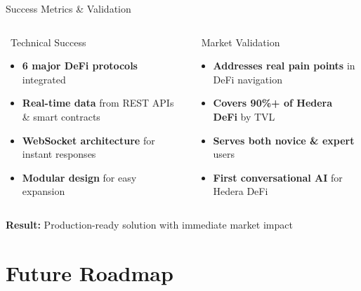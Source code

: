 \documentclass[aspectratio=169]{beamer}
\begin{document}
\begin{frame}{Success Metrics \& Validation}
\begin{columns}
\begin{block}{\faCheckCircle\ Technical Success}
\begin{itemize}
\item \textbf{6 major DeFi protocols} integrated
\item \textbf{Real-time data} from REST APIs \& smart contracts
\item \textbf{WebSocket architecture} for instant responses
\item \textbf{Modular design} for easy expansion
\end{itemize}
\end{block}

\begin{block}{\faUsers\ Market Validation}
\begin{itemize}
\item \textbf{Addresses real pain points} in DeFi navigation
\item \textbf{Covers 90\%+ of Hedera DeFi} by TVL
\item \textbf{Serves both novice \& expert} users
\item \textbf{First conversational AI} for Hedera DeFi
\end{itemize}
\end{block}
\end{columns}

\vspace{0.05cm}
\begin{center}
\footnotesize \textbf{Result:} Production-ready solution with immediate market impact
\end{center}
\end{frame}

\section{Future Roadmap}
\end{document}
